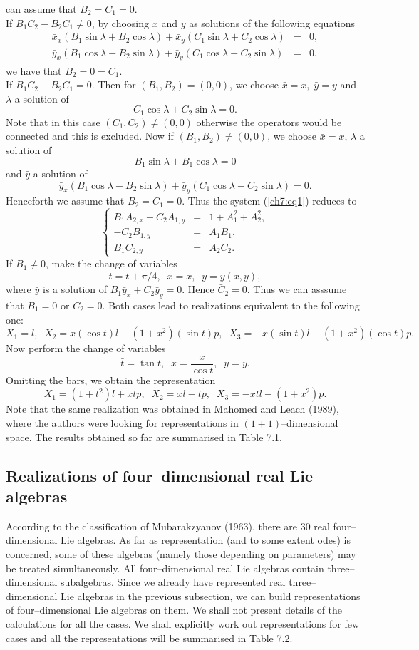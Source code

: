 can assume that $B_2=C_1=0$.\\ If $B_1C_2-B_2C_1\ne 0$, by choosing $\bar
x$ and $\bar y $ as solutions of the following equations \begin{eqnarray*}
\bar x_x (B_1\sin \lambda+B_2\cos \lambda)+\bar x_y (C_1\sin \lambda+
C_2\cos \lambda) &=& 0, \\ \bar y_x (B_1\cos \lambda-B_2\sin \lambda)+\bar
y_y (C_1\cos \lambda- C_2\sin \lambda) &=& 0, \end{eqnarray*} we have that
$\bar B_2=0=\bar C_1$.\\ If $B_1C_2-B_2C_1=0$. Then for $(B_1,B_2)=(0,0)$,
we choose $\bar x=x,\;\bar y=y$ and $\lambda$ a solution of \[C_1\cos
\lambda+C_2\sin \lambda=0.\] Note that in this case $(C_1,C_2)\ne (0,0)$
otherwise the operators would be connected and this is excluded. Now if
$(B_1,B_2)\ne (0,0)$, we choose $\bar x=x$, $\lambda$ a solution of
\[B_1\sin \lambda+B_1 \cos \lambda=0\] and $\bar y$ a solution of \[\bar y_x
(B_1\cos \lambda-B_2\sin \lambda)+\bar y_y (C_1\cos \lambda- C_2\sin
\lambda) = 0.\] Henceforth we assume that $B_2=C_1=0$. Thus the system
(\ref{ch7:eq1}) reduces to \[\left \{ \begin{array}{lll} B_1A_{2,x}-C_2A_{1,y}
&=& 1+A_1^2+A_2^2,\\ -C_2B_{1,y} &=& A_1B_1, \\ B_1C_{2,y} &=& A_2C_2.
\end{array} \right. \] If $B_1\ne 0$, make the change of variables \[\bar
t=t+\pi/4,\;\;\bar x=x,\;\; \bar y=\bar y (x,y),\] where $\bar y$ is a
solution of $ B_1\bar y_x+C_2\bar y_y=0.$ Hence $\bar C_2=0$. Thus we can
asssume that $B_1=0$ or $C_2=0$. Both cases lead to realizations
equivalent to the following one:
\[X_1=l,\;\; X_2=x(\cos t) l-(1+x^2)(\sin t)
p,\;\;X_3=-x(\sin t) l-(1+x^2)(\cos t) p.\]
Now perform the change of
variables \[\bar t= \tan t,\;\;\bar x= \frac{x}{\cos t},\;\; \bar y=y.\]
Omitting the bars, we obtain the representation
\[X_1=(1+t^2)l+xtp,\;\;X_2=xl-tp,\;\;X_3=-xtl-(1+x^2)p.\] Note that the
same realization was obtained in Mahomed and Leach (1989), where the
authors were looking for representations in $(1+1)$--dimensional space.
The results obtained so far are summarised in Table 7.1.  

\subsection{Realizations of four--dimensional real Lie algebras}

According to the classification of Mubarakzyanov (1963), there are
$30$ real four--dimensional Lie algebras. As far as representation (and to
some extent odes) is concerned, some of these algebras (namely those
depending on  parameters) may be treated simultaneously. All
four--dimensional  real Lie algebras contain three--dimensional
subalgebras. Since we already have represented real three--dimensional Lie
algebras in the previous subsection, we can build representations of
four--dimensional Lie algebras on them. We shall not present details of the
calculations for all the cases. We shall explicitly work out
representations for few cases and all the representations  will be
summarised in  Table 7.2.

